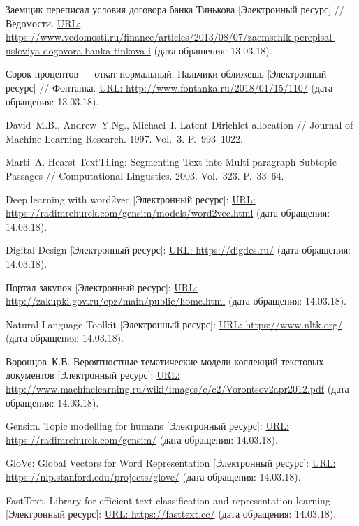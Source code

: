 \documentclass[12pt]{article}
\newcounter{c_tab}
\begin{document}
\newpage


\begin{thebibliography}{99}
\vspace{-7pt}

 Заемщик переписал условия договора банка Тинькова [Электронный ресурс] // Ведомости.  \url{URL: https://www.vedomosti.ru/finance/articles/2013/08/07/zaemschik-perepisal-usloviya-dogovora-banka-tinkova-i} (дата обращения: 13.03.18).

 Сорок процентов --- откат нормальный. Пальчики оближешь [Электронный ресурс] // Фонтанка.  \url{URL: http://www.fontanka.ru/2018/01/15/110/} (дата обращения: 13.03.18).

 David~M.\:B., Andrew~Y.\:Ng., Michael~I. Latent Dirichlet allocation // Journal of Machine Learning Research. 1997. Vol.~3. P.~993--1022.

 Marti~A. Hearst TextTiling: Segmenting Text into Multi-paragraph Subtopic Passages // Computational Lingustics. 2003. Vol.~323. P.~33--64.

 Deep learning with word2vec [Электронный ресурс]: \url{URL: https://radimrehurek.com/gensim/models/word2vec.html} (дата обращения: 14.03.18).

  Digital Design [Электронный ресурс]: \url{URL: https://digdes.ru/} (дата обращения: 14.03.18).

 Портал закупок [Электронный ресурс]: \url{URL: http://zakupki.gov.ru/epz/main/public/home.html} (дата обращения: 14.03.18).

 Natural Language Toolkit [Электронный ресурс]: \url{URL: https://www.nltk.org/} (дата обращения: 14.03.18).

 Воронцов~К.\:В. Вероятностные тематические модели коллекций текстовых документов [Электронный ресурс]: \url{URL:  http://www.machinelearning.ru/wiki/images/c/c2/Vorontsov2apr2012.pdf} (дата обращения: 14.03.18).

  Gensim. Topic modelling for humans [Электронный ресурс]: \url{URL: https://radimrehurek.com/gensim/} (дата обращения: 14.03.18).

  GloVe: Global Vectors for Word Representation [Электронный ресурс]: \url{URL: https://nlp.stanford.edu/projects/glove/} (дата обращения: 14.03.18).

  FastText. Library for efficient text classification and representation learning [Электронный ресурс]: \url{URL: https://fasttext.cc/} (дата обращения: 14.03.18).


\end{thebibliography}
\end{document}
